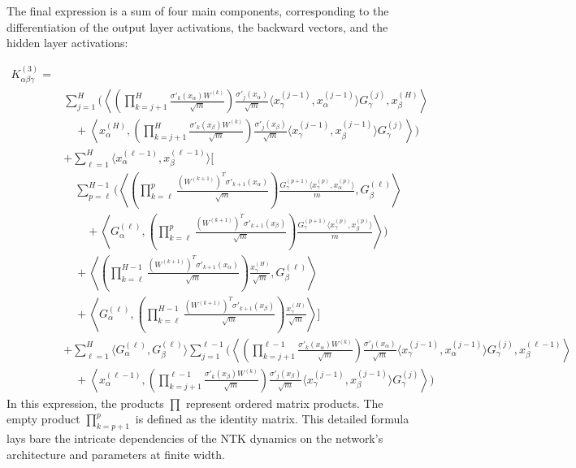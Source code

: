 \documentclass[11pt,a4paper]{article}
\theoremstyle{definition}
\begin{document}
The final expression is a sum of four main components, corresponding to the differentiation of the output layer activations, the backward vectors, and the hidden layer activations:

\begin{align}
K^{(3)}_{\alpha\beta\gamma} = & \nonumber \\
& \sum_{j=1}^{H} \Biggl( \left\langle \left( \prod_{k=j+1}^{H} \frac{\sigma'_{k}(x_\alpha) W^{(k)}}{\sqrt{m}} \right) \frac{\sigma'_{j}(x_\alpha)}{\sqrt{m}} \langle x^{(j-1)}_\gamma, x^{(j-1)}_\alpha \rangle G^{(j)}_\gamma, x^{(H)}_\beta \right\rangle \nonumber \\
& \quad + \left\langle x^{(H)}_\alpha, \left( \prod_{k=j+1}^{H} \frac{\sigma'_{k}(x_\beta) W^{(k)}}{\sqrt{m}} \right) \frac{\sigma'_{j}(x_\beta)}{\sqrt{m}} \langle x^{(j-1)}_\gamma, x^{(j-1)}_\beta \rangle G^{(j)}_\gamma \right\rangle \Biggr) \nonumber \\
& + \sum_{\ell=1}^{H} \langle x^{(\ell-1)}_\alpha, x^{(\ell-1)}_\beta \rangle \Biggl[ \nonumber \\
& \quad \sum_{p=\ell}^{H-1} \Biggl( \left\langle \left( \prod_{k=\ell}^{p} \frac{(W^{(k+1)})^T \sigma'_{k+1}(x_\alpha)}{\sqrt{m}} \right) \frac{G^{(p+1)}_\gamma \langle x^{(p)}_\gamma, x^{(p)}_\alpha \rangle}{m}, G^{(\ell)}_\beta \right\rangle \nonumber \\
& \qquad + \left\langle G^{(\ell)}_\alpha, \left( \prod_{k=\ell}^{p} \frac{(W^{(k+1)})^T \sigma'_{k+1}(x_\beta)}{\sqrt{m}} \right) \frac{G^{(p+1)}_\gamma \langle x^{(p)}_\gamma, x^{(p)}_\beta \rangle}{m} \right\rangle \Biggr) \nonumber \\
& \quad + \left\langle \left( \prod_{k=\ell}^{H-1} \frac{(W^{(k+1)})^T \sigma'_{k+1}(x_\alpha)}{\sqrt{m}} \right) \frac{x^{(H)}_\gamma}{\sqrt{m}}, G^{(\ell)}_\beta \right\rangle \nonumber \\
& \quad + \left\langle G^{(\ell)}_\alpha, \left( \prod_{k=\ell}^{H-1} \frac{(W^{(k+1)})^T \sigma'_{k+1}(x_\beta)}{\sqrt{m}} \right) \frac{x^{(H)}_\gamma}{\sqrt{m}} \right\rangle \Biggr] \nonumber \\
& + \sum_{\ell=1}^{H} \langle G^{(\ell)}_\alpha, G^{(\ell)}_\beta \rangle \sum_{j=1}^{\ell-1} \Biggl( \left\langle \left( \prod_{k=j+1}^{\ell-1} \frac{\sigma'_{k}(x_\alpha) W^{(k)}}{\sqrt{m}} \right) \frac{\sigma'_{j}(x_\alpha)}{\sqrt{m}} \langle x^{(j-1)}_\gamma, x^{(j-1)}_\alpha \rangle G^{(j)}_\gamma, x^{(\ell-1)}_\beta \right\rangle \nonumber \\
& \quad + \left\langle x^{(\ell-1)}_\alpha, \left( \prod_{k=j+1}^{\ell-1} \frac{\sigma'_{k}(x_\beta) W^{(k)}}{\sqrt{m}} \right) \frac{\sigma'_{j}(x_\beta)}{\sqrt{m}} \langle x^{(j-1)}_\gamma, x^{(j-1)}_\beta \rangle G^{(j)}_\gamma \right\rangle \Biggr)
\end{align}
In this expression, the products $\prod$ represent ordered matrix products. The empty product $\prod_{k=p+1}^p$ is defined as the identity matrix. This detailed formula lays bare the intricate dependencies of the NTK dynamics on the network's architecture and parameters at finite width.
\end{document}
